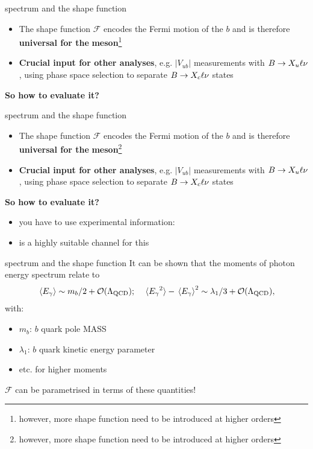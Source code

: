 \documentclass[xcolor=dvipsnames]{beamer}
\begin{document}
   \begin{frame}{\BtoXsgamma spectrum and the shape function}
      \small
      \begin{itemize}
         \item The shape function $\mathcal{F}$ encodes the Fermi motion of the $b$ and is therefore \textbf{universal for the}  \textbf{meson}\footnote[1]{\tiny however, more shape function need to be introduced at higher orders}
         \item \textbf{Crucial input for other analyses}, e.g. $|V_{ub}|$ measurements with $B\rightarrow X_u\ell\nu$, using phase space selection to separate $B\rightarrow X_c\ell\nu$ states
      \end{itemize}

      \textbf{So how to evaluate it?}

   \end{frame}


   \begin{frame}{\BtoXsgamma spectrum and the shape function}
      \small
      \begin{itemize}
         \item The shape function $\mathcal{F}$ encodes the Fermi motion of the $b$ and is therefore \textbf{universal for the}  \textbf{meson}\footnote[1]{\tiny however, more shape function need to be introduced at higher orders}
         \item \textbf{Crucial input for other analyses}, e.g. $|V_{ub}|$ measurements with $B\rightarrow X_u\ell\nu$, using phase space selection to separate $B\rightarrow X_c\ell\nu$ states
      \end{itemize}

      \textbf{So how to evaluate it?}
      \begin{itemize}
         \item[\ra] you have to use experimental information: 
         \item[\ra] \BtoXsgamma is a highly suitable channel for this
      \end{itemize}

   \end{frame}

   \begin{frame}{\BtoXsgamma spectrum and the shape function}
      \small
      It can be shown that the moments of photon energy spectrum relate to
      \begin{equation}\nonumber
         \expval**{{E_{\gamma}}} \sim m_b/2+{\cal O}(\Lambda_{\mathrm{QCD}}); \quad \expval**{{E_{\gamma}}^2}-\expval**{{E_{\gamma}}}^2 \sim \lambda_1/3+{\cal O}(\Lambda_{\mathrm{QCD}}),
     \end{equation}
     with:
     \begin{itemize}
      \item [] $m_b$: $b$ quark pole MASS
      \item [] $\lambda_1$: $b$ quark kinetic energy parameter
      \item [] etc. for higher moments
     \end{itemize}
   $\mathcal{F}$ can be parametrised in terms of these quantities!
   \end{frame}
\end{document}
